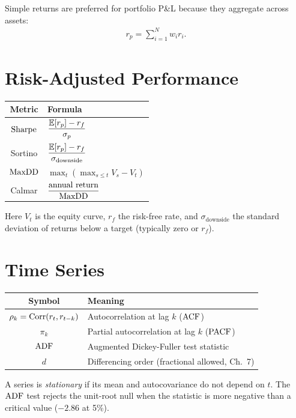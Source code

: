Simple returns are preferred for portfolio P\&L because they aggregate
across assets:
\begin{align}
r_p = \sum_{i=1}^{N} w_i r_i.
\end{align}

\section{Risk-Adjusted Performance}

\begin{center}
\begin{tabular}{cl}
\toprule
\textbf{Metric} & \textbf{Formula} \\
\midrule
$\text{Sharpe}$ & $\dfrac{\mathbb{E}[r_p] - r_f}{\sigma_p}$ \\
Sortino & $\dfrac{\mathbb{E}[r_p] - r_f}{\sigma_{\text{downside}}}$ \\
$\text{MaxDD}$ & $\max_{t} \left( \max_{s \le t} V_s - V_t \right)$ \\
Calmar & $\dfrac{\text{annual return}}{\text{MaxDD}}$ \\
\bottomrule
\end{tabular}
\end{center}

Here $V_t$ is the equity curve, $r_f$ the risk-free rate, and
$\sigma_{\text{downside}}$ the standard deviation of returns below a
target (typically zero or $r_f$).

\section{Time Series}

\begin{center}
\begin{tabular}{cl}
\toprule
\textbf{Symbol} & \textbf{Meaning} \\
\midrule
$\rho_k = \text{Corr}(r_t, r_{t-k})$ & Autocorrelation at lag $k$ ($\text{ACF}$) \\
$\pi_k$ & Partial autocorrelation at lag $k$ ($\text{PACF}$) \\
$\text{ADF}$ & Augmented Dickey-Fuller test statistic \\
$d$ & Differencing order (fractional allowed, Ch.~7) \\
\bottomrule
\end{tabular}
\end{center}

A series is \emph{stationary} if its mean and autocovariance do not
depend on $t$. The $\text{ADF}$ test rejects the unit-root null when the
statistic is more negative than a critical value ($-2.86$ at 5\%).

